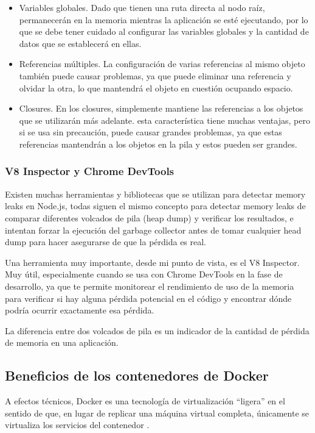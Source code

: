 \begin{itemize}
  \item Variables globales. Dado que tienen una ruta directa al nodo raíz, permanecerán en la memoria mientras la aplicación se esté ejecutando, por lo que se debe tener cuidado al configurar las variables globales y la cantidad de datos que se establecerá en ellas.
  \item Referencias múltiples. La configuración de varias referencias al mismo objeto también puede causar problemas, ya que puede eliminar una referencia y olvidar la otra, lo que mantendrá el objeto en cuestión ocupando espacio.
  \item Closures. En los closures, simplemente mantiene las referencias a los objetos que se utilizarán más adelante. esta característica tiene muchas ventajas, pero si se usa sin precaución, puede causar grandes problemas, ya que estas referencias mantendrán a los objetos en la pila y estos pueden ser grandes.
\end{itemize}

\subsubsection{V8 Inspector y Chrome DevTools}

Existen muchas herramientas y bibliotecas que se utilizan para detectar memory leaks en Node.js, todas siguen el mismo concepto para detectar memory leaks de comparar diferentes volcados de pila (heap dump) y verificar los resultados, e intentan forzar la ejecución del garbage collector antes de tomar cualquier head dump para hacer asegurarse de que la pérdida es real.

Una herramienta muy importante, desde mi punto de vista, es el V8 Inspector. Muy útil, especialmente cuando se usa con Chrome DevTools en la fase de desarrollo, ya que te permite monitorear el rendimiento de uso de la memoria para verificar si hay alguna pérdida potencial en el código y encontrar dónde podría ocurrir exactamente esa pérdida.

La diferencia entre dos volcados de pila es un indicador de la cantidad de pérdida de memoria en una aplicación.

\subsection{Beneficios de los contenedores de Docker}

A efectos técnicos, Docker es una tecnología de virtualización “ligera” en el sentido de que, en lugar de replicar una máquina virtual completa, únicamente se virtualiza los servicios del contenedor \cite{docker3}.

